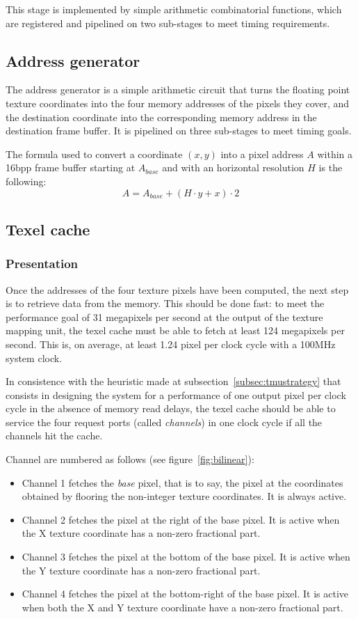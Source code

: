 \documentclass[a4paper,11pt]{kthesis}
\begin{document}
This stage is implemented by simple arithmetic combinatorial functions, which are registered and pipelined on two sub-stages to meet timing requirements.

\subsection{Address generator}
The address generator is a simple arithmetic circuit that turns the floating point texture coordinates into the four memory addresses of the pixels they cover, and the destination coordinate into the corresponding memory address in the destination frame buffer. It is pipelined on three sub-stages to meet timing goals.

The formula used to convert a coordinate $(x,y)$ into a pixel address $A$ within a 16bpp frame buffer starting at $A_{base}$ and with an horizontal resolution $H$ is the following:
\begin{equation}\label{eq:fbadr}
A = A_{base} + (H \cdot y + x) \cdot 2
\end{equation}

\subsection{Texel cache}
\label{subsec:texelcache}
\subsubsection{Presentation}
Once the addresses of the four texture pixels have been computed, the next step is to retrieve data from the memory. This should be done fast: to meet the performance goal of 31 megapixels per second at the output of the texture mapping unit, the texel cache must be able to fetch at least 124 megapixels per second. This is, on average, at least 1.24 pixel per clock cycle with a 100MHz system clock.

In consistence with the heuristic made at subsection~\ref{subsec:tmustrategy} that consists in designing the system for a performance of one output pixel per clock cycle in the absence of memory read delays, the texel cache should be able to service the four request ports (called \textit{channels}) in one clock cycle if all the channels hit the cache.

Channel are numbered as follows (see figure~\ref{fig:bilinear}):
\begin{itemize}
\item Channel 1 fetches the \textit{base} pixel, that is to say, the pixel at the coordinates obtained by flooring the non-integer texture coordinates. It is always active.
\item Channel 2 fetches the pixel at the right of the base pixel. It is active when the X texture coordinate has a non-zero fractional part.
\item Channel 3 fetches the pixel at the bottom of the base pixel. It is active when the Y texture coordinate has a non-zero fractional part.
\item Channel 4 fetches the pixel at the bottom-right of the base pixel. It is active when both the X and Y texture coordinate have a non-zero fractional part.
\end{itemize}
\end{document}
